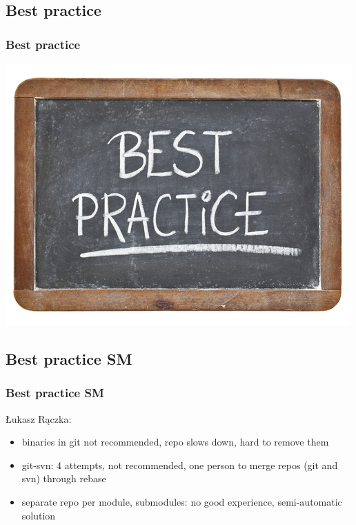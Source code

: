 \documentclass{beamer}
\begin{document}
		\subsection{Best practice}
		\begin{frame}
			\frametitle{Best practice}
			\begin{center}
				\includegraphics[scale=2.5]{images/best-practice}
			\end{center}
		\end{frame}	
		
	\subsection{Best practice SM}
		\begin{frame}
			\frametitle{Best practice SM}
            Łukasz Rączka:
			\begin{itemize}
                \item binaries in git not recommended, repo slows down, hard to remove them
                \item git-svn: 4 attempts, not recommended, one person to merge repos (git and svn) through rebase
                \item separate repo per module, submodules: no good experience, semi-automatic solution
			\end{itemize}
		\end{frame}
		
\end{document}
